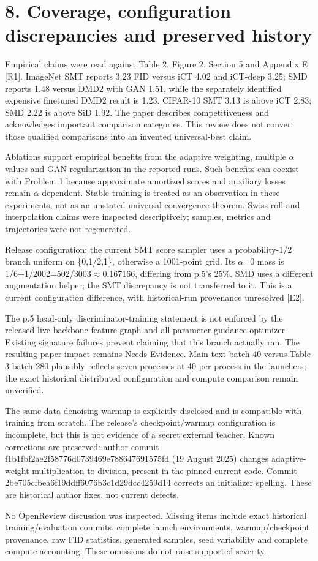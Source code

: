 \documentclass[10pt]{article}
\begin{document}
\section*{8. Coverage, configuration discrepancies and preserved history}
Empirical claims were read against Table 2, Figure 2, Section 5 and Appendix E [R1]. ImageNet SMT reports 3.23 FID versus iCT 4.02 and iCT-deep 3.25; SMD reports 1.48 versus DMD2 with GAN 1.51, while the separately identified expensive finetuned DMD2 result is 1.23. CIFAR-10 SMT 3.13 is above iCT 2.83; SMD 2.22 is above SiD 1.92. The paper describes competitiveness and acknowledges important comparison categories. This review does not convert those qualified comparisons into an invented universal-best claim.\par
Ablations support empirical benefits from the adaptive weighting, multiple \(\alpha\) values and GAN regularization in the reported runs. Such benefits can coexist with Problem 1 because approximate amortized scores and auxiliary losses remain \(\alpha\)-dependent. Stable training is treated as an observation in these experiments, not as an unstated universal convergence theorem. Swiss-roll and interpolation claims were inspected descriptively; samples, metrics and trajectories were not regenerated.\par
Release configuration: the current SMT score sampler uses a probability-1/2 branch uniform on \{0,1/2,1\}, otherwise a 1001-point grid. Its \(\alpha\)=0 mass is 1/6+1/2002=502/3003\(\approx\)0.167166, differing from p.5’s 25\%. SMD uses a different augmentation helper; the SMT discrepancy is not transferred to it. This is a current configuration difference, with historical-run provenance unresolved [E2].\par
The p.5 head-only discriminator-training statement is not enforced by the released live-backbone feature graph and all-parameter guidance optimizer. Existing signature failures prevent claiming that this branch actually ran. The resulting paper impact remains Needs Evidence. Main-text batch 40 versus Table 3 batch 280 plausibly reflects seven processes at 40 per process in the launchers; the exact historical distributed configuration and compute comparison remain unverified.\par
The same-data denoising warmup is explicitly disclosed and is compatible with training from scratch. The release’s checkpoint/warmup configuration is incomplete, but this is not evidence of a secret external teacher. Known corrections are preserved: author commit f1b1fbf2ae2f58776d0739469e788647691575fd (19 August 2025) changes adaptive-weight multiplication to division, present in the pinned current code. Commit 2be705cfbea6f19ddff6076b3c1d29dcc4259d14 corrects an initializer spelling. These are historical author fixes, not current defects.\par
No OpenReview discussion was inspected. Missing items include exact historical training/evaluation commits, complete launch environments, warmup/checkpoint provenance, raw FID statistics, generated samples, seed variability and complete compute accounting. These omissions do not raise supported severity.\par
\end{document}
